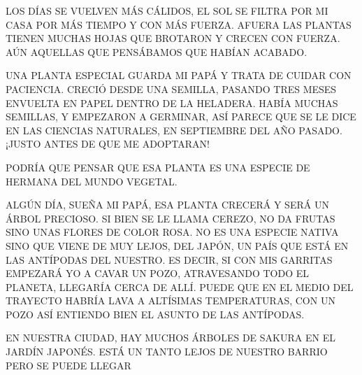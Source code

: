 \newpage
{}
LOS DÍAS SE VUELVEN MÁS CÁLIDOS, EL SOL SE FILTRA POR MI CASA POR MÁS TIEMPO Y CON MÁS FUERZA. AFUERA LAS PLANTAS TIENEN MUCHAS HOJAS QUE BROTARON Y CRECEN CON FUERZA. AÚN AQUELLAS QUE PENSÁBAMOS QUE HABÍAN ACABADO.

UNA PLANTA ESPECIAL GUARDA MI PAPÁ Y TRATA DE CUIDAR CON PACIENCIA. CRECIÓ DESDE UNA SEMILLA, PASANDO TRES MESES ENVUELTA EN PAPEL DENTRO DE LA HELADERA. HABÍA MUCHAS SEMILLAS, Y EMPEZARON A GERMINAR, ASÍ PARECE QUE SE LE DICE EN LAS CIENCIAS NATURALES, EN SEPTIEMBRE DEL AÑO PASADO. ¡JUSTO ANTES DE QUE ME ADOPTARAN!

PODRÍA QUE PENSAR QUE ESA PLANTA ES UNA ESPECIE DE HERMANA DEL MUNDO VEGETAL.





\newpage
{}
\begin{normalsize}
	
	ALGÚN DÍA, SUEÑA MI PAPÁ, ESA PLANTA CRECERÁ Y SERÁ UN ÁRBOL PRECIOSO. SI BIEN SE LE LLAMA CEREZO, NO DA FRUTAS SINO UNAS FLORES DE COLOR ROSA. NO ES UNA ESPECIE NATIVA SINO QUE VIENE DE MUY LEJOS, DEL JAPÓN, UN PAÍS QUE ESTÁ EN LAS ANTÍPODAS DEL NUESTRO. ES DECIR, SI CON MIS GARRITAS EMPEZARÁ YO A CAVAR UN POZO, ATRAVESANDO TODO EL PLANETA, LLEGARÍA CERCA DE ALLÍ.  PUEDE  QUE EN EL MEDIO DEL TRAYECTO HABRÍA LAVA A ALTÍSIMAS TEMPERATURAS, CON UN POZO ASÍ ENTIENDO BIEN EL ASUNTO DE LAS ANTÍPODAS.
	
	EN NUESTRA CIUDAD, HAY MUCHOS ÁRBOLES DE SAKURA EN EL JARDÍN JAPONÉS. ESTÁ UN TANTO LEJOS DE NUESTRO BARRIO PERO SE PUEDE LLEGAR 
	
\end{normalsize}	



